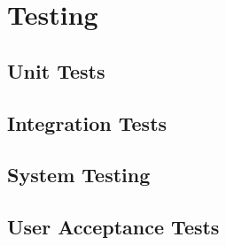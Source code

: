 \chapter{Testing}
\section{Unit Tests}
\section{Integration Tests}
\section{System Testing}
\section{User Acceptance Tests}